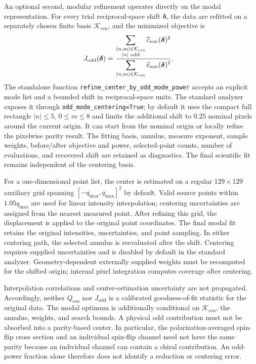 \documentclass[aps,prb,preprint,onecolumn,notitlepage,amsmath,amssymb,
  superscriptaddress,floatfix]{revtex4-2}
\newcommand{\Modes}{\mathcal{K}}
\begin{document}
An optional second, modular refinement operates directly on the modal
representation. For every trial reciprocal-space shift $\bm\delta$, the data
are refitted on a separately chosen finite basis $\Modes_{\mathrm{cen}}$, and
the minimized objective is
\begin{equation}
 J_{\mathrm{odd}}(\bm\delta)=
 \frac{\displaystyle\sum_{\substack{(n,m)\in\Modes_{\mathrm{cen}}\\
                         |n|\ {\rm odd}}}
       \widehat c_{nm}(\bm\delta)^2}
      {\displaystyle\sum_{(n,m)\in\Modes_{\mathrm{cen}}}
       \widehat c_{nm}(\bm\delta)^2}.
 \label{eq:odd-mode-centering}
\end{equation}
The standalone function
\texttt{refine\_center\_by\_odd\_mode\_power} accepts an explicit mode list
and a bounded shift in reciprocal-space units. The standard analyzer exposes
it through \texttt{odd\_mode\_centering=True}; by default it uses the compact
full rectangle $|n|\leq5$, $0\leq m\leq8$ and limits the additional shift to
$0.25$ nominal pixels around the current origin. It can start from the
nominal origin or locally refine the pixelwise parity result. The fitting
basis, annulus, measure exponent, sample weights, before/after objective and
power, selected-point counts, number of evaluations, and recovered shift are
retained as diagnostics. The final scientific fit remains independent of
the centering basis.

For a one-dimensional point list, the center is estimated on a regular
$129\times129$ auxiliary grid spanning $[-q_{\max},q_{\max}]^2$ by default.
Valid source points within $1.05q_{\max}$ are used for linear intensity
interpolation; centering uncertainties are assigned from the nearest
measured point. After refining this grid, the displacement is applied to
the original point coordinates. The final modal fit retains the original
intensities, uncertainties, and point sampling. In either centering path,
the selected annulus is reevaluated after the shift. Centering requires
supplied uncertainties and is disabled by default in the standard analyzer.
Geometry-dependent externally supplied weights must be recomputed for the
shifted origin; internal pixel integration computes coverage after centering.

Interpolation correlations and center-estimation uncertainty are not
propagated. Accordingly, neither $Q_{\mathrm{cen}}$ nor
$J_{\mathrm{odd}}$ is a calibrated goodness-of-fit statistic for the original
data. The modal optimum is additionally conditional on
$\Modes_{\mathrm{cen}}$, the annulus, weights, and search bounds. A physical
odd contribution must not be absorbed into a parity-based center.
In particular, the polarization-averaged spin-flip cross section and an
individual spin-flip channel need not have the same parity because an
individual channel can contain a chiral contribution. An odd-power fraction
alone therefore does not identify a reduction or centering error.
\end{document}
